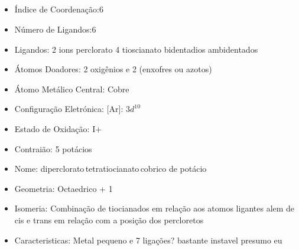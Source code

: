 \documentclass[12pt]{article}
\begin{document}
\noindent\begin{minipage}{\textwidth}
	
	\subsection{}
	\begin{itemize}
   
   \item Índice de Coordenação:6
   
   \item Número de Ligandos:6
   
   \item Ligandos: 
   	2 ions perclorato 
		4 tioscianato bidentadios ambidentados
   
   \item Átomos Doadores:
   	2 oxigênios e 2 (enxofres ou azotos)
   
   \item Átomo Metálico Central:
   	Cobre
   
   \item Configuração Eletrónica:
   	[Ar]: $3d^{10}$
   
   \item Estado de Oxidação:
   	I+
   
   \item Contraião:
   	5 potácios
   
   \item Nome:
   	diperclorato\,tetratiocianato\,cobrico de potácio
   
   \item Geometria:
   	Octaedrico + 1
   	
   \item Isomeria:
   	Combinação de tiocianados em relação aos atomos ligantes
		alem de cis e trans em relação com a posição dos percloretos

	\item Caracteristicas:
		Metal pequeno e 7 ligações? bastante instavel presumo eu
		

	\end{itemize}
	
\end{minipage}
\end{document}
